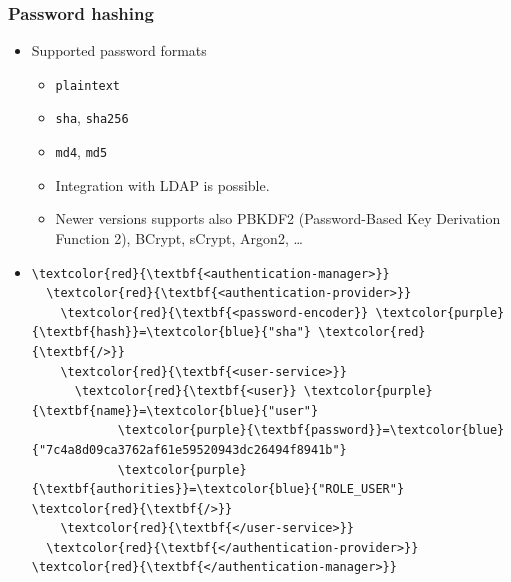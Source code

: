\documentclass[10pt,xcolor=pdflatex, table]{beamer}
\begin{document}
\begin{frame}[fragile]\frametitle{Password hashing}
	\begin{itemize}
		\item Supported password formats
        \begin{itemize}
        	\item \texttt{plaintext}
        	\item \texttt{sha}, \texttt{sha256}
        	\item \texttt{md4}, \texttt{md5}
            \item Integration with LDAP is possible.
            \item Newer versions supports also PBKDF2 (Password-Based Key Derivation Function 2), BCrypt, sCrypt, Argon2, \ldots
        \end{itemize}
        \item[]
        	\bigskip
  			\begin{Verbatim}[fontsize=\footnotesize, commandchars=\\\{\}]  
\textcolor{red}{\textbf{<authentication-manager>}}
  \textcolor{red}{\textbf{<authentication-provider>}}
    \textcolor{red}{\textbf{<password-encoder}} \textcolor{purple}{\textbf{hash}}=\textcolor{blue}{"sha"} \textcolor{red}{\textbf{/>}}
    \textcolor{red}{\textbf{<user-service>}}
      \textcolor{red}{\textbf{<user}} \textcolor{purple}{\textbf{name}}=\textcolor{blue}{"user"} 
            \textcolor{purple}{\textbf{password}}=\textcolor{blue}{"7c4a8d09ca3762af61e59520943dc26494f8941b"}
            \textcolor{purple}{\textbf{authorities}}=\textcolor{blue}{"ROLE_USER"} \textcolor{red}{\textbf{/>}}
    \textcolor{red}{\textbf{</user-service>}}
  \textcolor{red}{\textbf{</authentication-provider>}}
\textcolor{red}{\textbf{</authentication-manager>}}
   			\end{Verbatim}
    \end{itemize}
\end{frame}
\end{document}
